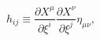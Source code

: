 \begin{equation}
h_{ij}\equiv \frac{{\partial}X^{\mu}}{{\partial}{\xi}^{i}}
\frac{{\partial}X^{\nu}}{{\partial}{\xi}^{j}}{\eta}_{{\mu}{\nu}},
\end{equation}

